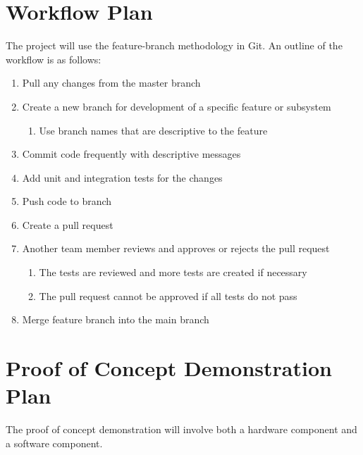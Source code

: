 \documentclass{article}
\begin{document}
\section{Workflow Plan}
{The project will use the feature-branch methodology in Git. An outline of the workflow is as follows:}
\begin{enumerate}
    \item Pull any changes from the master branch
    \item Create a new branch for development of a specific feature or subsystem
        \begin{enumerate}
            \item Use branch names that are descriptive to the feature
        \end{enumerate}
    \item Commit code frequently with descriptive messages
    \item Add unit and integration tests for the changes
    \item Push code to branch
    \item Create a pull request
    \item Another team member reviews and approves or rejects the pull request
        \begin{enumerate}
            \item The tests are reviewed and more tests are created if necessary
            \item The pull request cannot be approved if all tests do not pass
        \end{enumerate}
    \item Merge feature branch into the main branch
\end{enumerate}

\section{Proof of Concept Demonstration Plan}

The proof of concept demonstration will involve both a hardware component and a software component.
\end{document}
